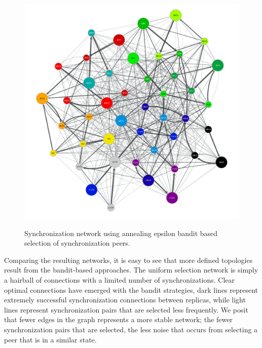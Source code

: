\begin{figure}
    \begin{center}
        \includegraphics[width=5in]{figures/ch06_b-annealing-epsilon-greedy-e5.pdf}
    \end{center}
    \renewcommand{\baselinestretch}{1}
    \small\normalsize

    \begin{quote}
        \caption[Annealing Epsilon Anti-Entropy Synchronization Network]{Synchronization network using annealing epsilon bandit based selection of synchronization peers.}
        \label{fig:ch06_annealing_epsilon_toplogy}
    \end{quote}
\end{figure}
\renewcommand{\baselinestretch}{2}
\small\normalsize

Comparing the resulting networks, it is easy to see that more defined
topologies result from the bandit-based approaches.
The uniform selection network is simply a hairball of connections with
a limited number of synchronizations.
Clear optimal connections have emerged with the bandit strategies, dark
lines represent extremely successful synchronization connections between
replicas, while light lines represent synchronization pairs that are
selected less frequently.
We posit that fewer edges in the graph represents a more stable network;
the fewer synchronization pairs that are selected, the less noise that
occurs from selecting a peer that is in a similar state.


